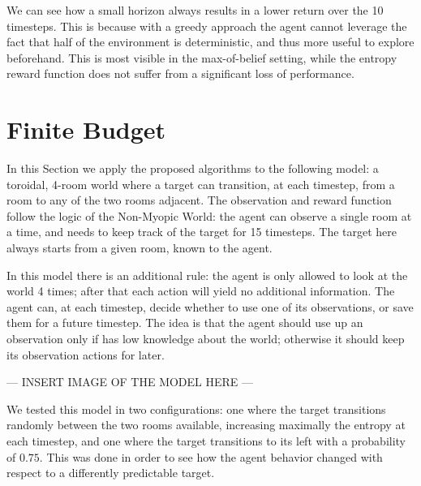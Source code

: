 We can see how a small horizon always results in a lower return over the 10 timesteps. This is
because with a greedy approach the agent cannot leverage the fact that half of the environment is
deterministic, and thus more useful to explore beforehand. This is most visible in the max-of-belief
setting, while the entropy reward function does not suffer from a significant loss of performance.

\clearpage
\section{Finite Budget}

In this Section we apply the proposed algorithms to the following model: a toroidal, 4-room world
where a target can transition, at each timestep, from a room to any of the two rooms adjacent. The
observation and reward function follow the logic of the Non-Myopic World: the agent can observe a
single room at a time, and needs to keep track of the target for 15 timesteps. The target here
always starts from a given room, known to the agent.

In this model there is an additional rule: the agent is only allowed to look at the world 4 times;
after that each action will yield no additional information. The agent can, at each timestep, decide
whether to use one of its observations, or save them for a future timestep. The idea is that
the agent should use up an observation only if has low knowledge about the world; otherwise it
should keep its observation actions for later.

--- INSERT IMAGE OF THE MODEL HERE ---

We tested this model in two configurations: one where the target transitions randomly between the
two rooms available, increasing maximally the entropy at each timestep, and one where the target
transitions to its left with a probability of $0.75$. This was done in order to see how the agent behavior
changed with respect to a differently predictable target.

